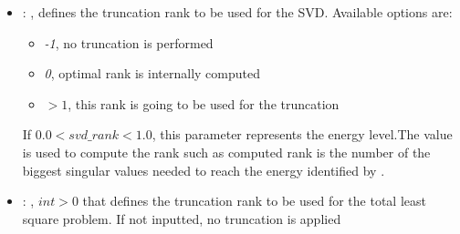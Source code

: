 \begin{itemize}
\begin{itemize}
        \item {}: ,
          GPR restart parameter. The number of restarts of the optimizer for finding the
          kernel parameters which maximize the log-marginal likelihood. The first run of the
          optimizer                                                  is performed from the kernel’s
          initial parameters, the remaining ones (if any) from thetas
          sampled log-uniform randomly from the space of allowed theta-values. If greater than 0,
          all bounds must be finite. Note that $n\_restarts\_optimizer == 0$ implies that one run is
          performed.

        \item {}: ,
          GPR normalization. Whether or not to normalize the target values y by removing the mean
          and scaling                                                  to unit-variance. This is
          recommended for cases where zero-mean, unit-variance priors are used.
          Note that, in this implementation, the normalisation is reversed before the GP predictions
          are reported.
      \end{itemize}

    \item {}: ,
      defines the truncation rank to be used for the SVD.
      Available options are:                                                  \begin{itemize}
      \item \textit{-1}, no truncation is performed
      \item \textit{0}, optimal rank is internally computed
      \item \textit{$>1$}, this rank is going to be used for the truncation
      \end{itemize}                                                  If $0.0 < svd\_rank < 1.0$,
      this parameter represents the energy level.The value is used to compute the rank such
      as computed rank is the number of the biggest singular values needed to reach the energy
      identified by                                                    .

    \item {}: ,
      $int > 0$ that defines the truncation rank to be used for the total
      least square problem. If not inputted, no truncation is applied


\end{itemize}
